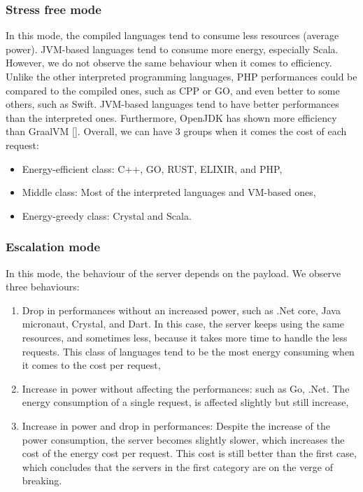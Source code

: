 \subsubsection{Stress free mode}
In this mode, the compiled languages tend to consume less resources (average power).
JVM-based languages tend to consume more energy, especially Scala.
However, we do not observe the same behaviour when it comes to efficiency.
Unlike the other interpreted programming languages, PHP performances could be compared to the compiled ones, such as CPP or GO, and even better to some others, such as Swift.
JVM-based languages tend to have better performances than the interpreted ones.
Furthermore, OpenJDK has shown more efficiency than GraalVM [].
Overall, we can have 3 groups when it comes the cost of each request:
\begin{itemize}
    \item Energy-efficient class: C++, GO, RUST, ELIXIR, and PHP,
    \item Middle class: Most of the interpreted languages and VM-based ones,
    \item Energy-greedy class: Crystal and Scala.
\end{itemize}

\subsubsection{Escalation mode}
In this mode, the behaviour of the server depends on the payload. We observe three behaviours:
\begin{enumerate}
    \item Drop in performances without an increased power, such as .Net core, Java micronaut, Crystal, and Dart.
          In this case, the server keeps using the same resources, and sometimes less, because it takes more time to handle the less requests.
          This class of languages tend to be the most energy consuming when it comes to the cost per request,
    \item Increase in power without affecting the performances: such as Go, .Net.
          The energy consumption of a single request, is affected slightly but still increase,
    \item Increase in power and drop in performances: Despite the increase of the power consumption, the server becomes slightly slower, which increases the cost of the energy cost per request.
          This cost is still better than the first case, which concludes that the servers in the first category are on the verge of breaking.
\end{enumerate}

